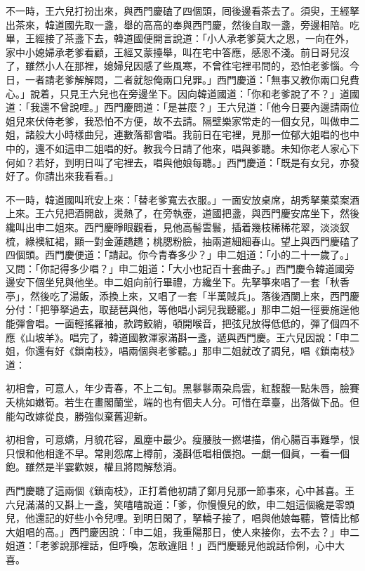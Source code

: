 不一時，王六兒打扮出來，與西門慶磕了四個頭，囘後邊看茶去了。須臾，王經拏出茶來，韓道國先取一盞，舉的高高的奉與西門慶，然後自取一盞，旁邊相陪。吃畢，王經接了茶盞下去，韓道國便開言說道：「小人承老爹莫大之恩，一向在外，家中小媳婦承老爹看顧，{}王經又蒙擡舉，叫在宅中答應，感恩不淺。前日哥兒沒了，雖然小人在那裡，媳婦兒因感了些風寒，不曾徃宅裡弔問的，恐怕老爹惱。今日，一者請老爹解解悶，二者就恕俺兩口兒罪。」西門慶道：「無事又教你兩口兒費心。」說着，只見王六兒也在旁邊坐下。因向韓道國道：「你和老爹說了不？」道國道：「我還不曾說哩。」西門慶問道：「是甚麼？」王六兒道：「他今日要內邊請兩位姐兒來伏侍老爹，我恐怕不方便，故不去請。隔壁樂家常走的一個女兒，叫做申二姐，諸般大小時樣曲兒，連數落都會唱。我前日在宅裡，見那一位郁大姐唱的也中中的，還不如這申二姐唱的好。教我今日請了他來，唱與爹聽。未知你老人家心下何如？若好，到明日叫了宅裡去，唱與他娘每聽。」西門慶道：「既是有女兒，亦發好了。你請出來我看看。」

不一時，韓道國叫玳安上來：「替老爹寬去衣服。」一面安放桌席，胡秀拏菓菜案酒上來。王六兒把酒開啟，燙熱了，在旁執壺，道國把盞，與西門慶安席坐下，然後纔叫出申二姐來。西門慶睜眼觀看，見他高髻雲鬟，插着幾枝稀稀花翠，淡淡釵梳，綠襖紅裙，顯一對金蓮趫趫；桃腮粉臉，抽兩道細細春山。{}望上與西門慶磕了四個頭。西門慶便道：「請起。你今青春多少？」申二姐道：「小的二十一歲了。」又問：「你記得多少唱？」申二姐道：「大小也記百十套曲子。」西門慶令韓道國旁邊安下個坐兒與他坐。申二姐向前行畢禮，方纔坐下。先拏箏來唱了一套「秋香亭」，然後吃了湯飯，添換上來，又唱了一套「半萬賊兵」。落後酒闌上來，西門慶分付：「把箏拏過去，取琵琶與他，等他唱小詞兒我聽罷。」那申二姐一徑要施逞他能彈會唱。一面輕搖羅袖，款跨鮫綃，頓開喉音，把弦兒放得低低的，彈了個四不應《山坡羊》。唱完了，韓道國教渾家滿斟一盞，遞與西門慶。王六兒因說：「申二姐，你還有好《鎖南枝》，唱兩個與老爹聽。」那申二姐就改了調兒，唱《鎖南枝》道：

\begin{myquote}
初相會，可意人，年少青春，不上二旬。黑鬖鬖兩朶烏雲，紅馥馥一點朱唇，臉賽夭桃如嫩筍。若生在畫閣蘭堂，端的也有個夫人分。可惜在章臺，出落做下品。但能勾改嫁從良，勝強似棄舊迎新。

初相會，可意嬌，月貌花容，風塵中最少。瘦腰肢一撚堪描，俏心腸百事難學，恨只恨和他相逢不早。常則怨席上樽前，淺斟低唱相偎抱。一覷一個眞，一看一個飽。雖然是半霎歡娛，權且將悶解愁消。
\end{myquote}

西門慶聽了這兩個《鎖南枝》，正打着他初請了鄭月兒那一節事來，心中甚喜。王六兒滿滿的又斟上一盞，笑嘻嘻說道：「爹，你慢慢兒的飲，申二姐這個纔是零頭兒，{}他還記的好些小令兒哩。到明日閑了，拏轎子接了，唱與他娘每聽，管情比郁大姐唱的高。」西門慶因說：「申二姐，我重陽那日，使人來接你，去不去？」申二姐道：「老爹說那裡話，但呼喚，怎敢違阻！」西門慶聽見他說話伶俐，心中大喜。

